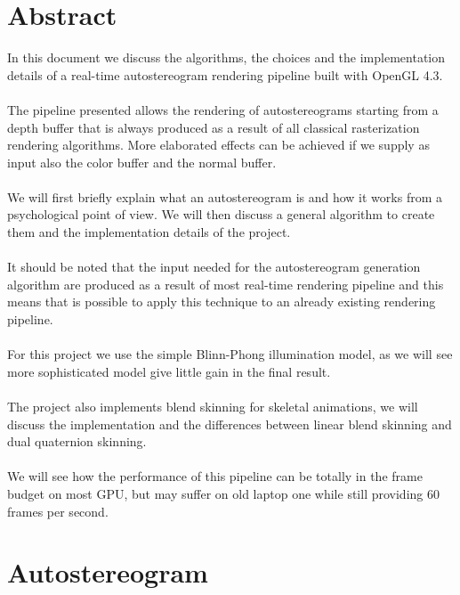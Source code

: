 \documentclass[12pt, a4paper]{article}
\begin{document}
\section{Abstract}
In this document we discuss the algorithms, the choices and the implementation details of a real-time autostereogram rendering pipeline built with OpenGL 4.3.\\\\
The pipeline presented allows the rendering of autostereograms starting from a depth buffer that is always produced
as a result of all classical rasterization rendering algorithms. More elaborated effects can be achieved if we supply as input also the color buffer and 
the normal buffer.\\\\
We will first briefly explain what an autostereogram is and how it works from a psychological point of view. 
We will then discuss a general algorithm to create them and the implementation details of the project.\\\\
It should be noted that the input needed for the autostereogram generation algorithm are produced as a result of most real-time rendering pipeline and this 
means that is possible to apply this technique to an already existing rendering pipeline.\\\\
For this project we use the simple Blinn-Phong illumination model, as we will see more sophisticated model give little gain in 
the final result.\\\\
The project also implements blend skinning for skeletal animations, we will discuss the implementation and the differences between linear blend skinning and
dual quaternion skinning.\\\\
We will see how the performance of this pipeline can be totally in the frame budget on most GPU, but may suffer on old laptop one while still
providing 60 frames per second.

\clearpage
\section{Autostereogram}
\end{document}
